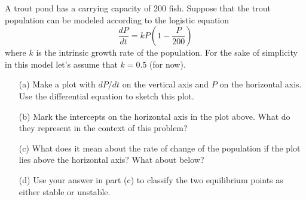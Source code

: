 \begin{problem}
    A trout pond has a carrying capacity of 200 fish.  Suppose that the trout population
    can be modeled according to the logistic equation
    \[ \frac{dP}{dt} = kP\left( 1-\frac{P}{200} \right) \]
    where $k$ is the intrinsic growth rate of the population.  For the sake of simplicity
    in this model let's assume that $k = 0.5$ (for now).  
    \begin{enumerate}
        \item[(a)] Make a plot with $dP/dt$ on the vertical axis and $P$ on
            the horizontal axis.  Use the differential equation to sketch this plot.
        \item[(b)] Mark the intercepts on the horizontal axis in the plot above.  What do
            they represent in the context of this problem?
        \item[(c)] What does it mean about the rate of change of the population if  the
            plot lies above the horizontal axis?  What about below?
        \item[(d)] Use your answer in part (c) to classify the two equilibrium points as
            either stable or unstable.
    \end{enumerate}
\end{problem}


